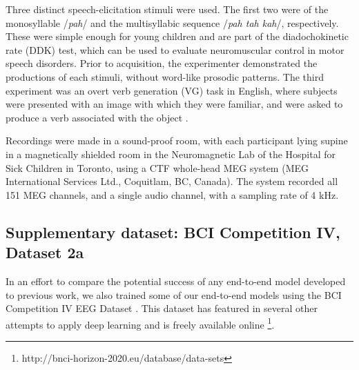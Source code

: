 \documentclass[utf8]{frontiersSCNS} %
\begin{document}

Three distinct speech-elicitation stimuli were used. The first two were of the monosyllable /{\em pah}/ and the multisyllabic sequence /{\em pah tah kah}/, respectively. These were simple enough for young children and are part of the diadochokinetic rate (DDK) test, which can be used to evaluate neuromuscular control in motor speech disorders. Prior to acquisition, the experimenter demonstrated the productions of each stimuli, without word-like prosodic patterns. The third experiment was an overt verb generation (VG) task in English, where subjects were presented with an image with which they were familiar, and were asked to produce a verb associated with the object \cite{Doesburg2016}.

Recordings were made in a sound-proof room, with each participant lying supine in a magnetically shielded room in the Neuromagnetic Lab of the Hospital for Sick Children in Toronto, using a CTF whole-head MEG system (MEG International Services Ltd., Coquitlam, BC, Canada). The system recorded all 151 MEG channels, and a single audio channel, with a sampling rate of 4 kHz.

\subsection{Supplementary dataset: BCI Competition IV, Dataset 2a}

In an effort to compare the potential success of any end-to-end model developed to previous work, we also trained some of our end-to-end models using the BCI Competition IV EEG Dataset \cite{Tangermann2012}. This dataset has featured in several other attempts to apply deep learning and is freely available online \footnote{http://bnci-horizon-2020.eu/database/data-sets}.
\end{document}
